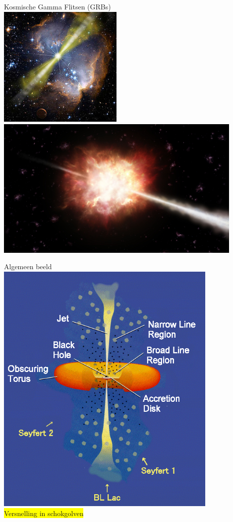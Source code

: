 \newpage

\begin{center}
{\blue Kosmische Gamma Flitsen (GRBs)}\\[1cm]
\includegraphics[keepaspectratio,width=6cm]{grb}\\[3mm]
\includegraphics[keepaspectratio,width=12cm]{grb2}
\end{center}

\Tr
\begin{center}
{\blue Algemeen beeld}\\[2mm]
\includegraphics[keepaspectratio,height=12.5cm]{agn-1}\\[5mm]
\colorbox{yellow}{Versnelling in schokgolven}
\end{center}

